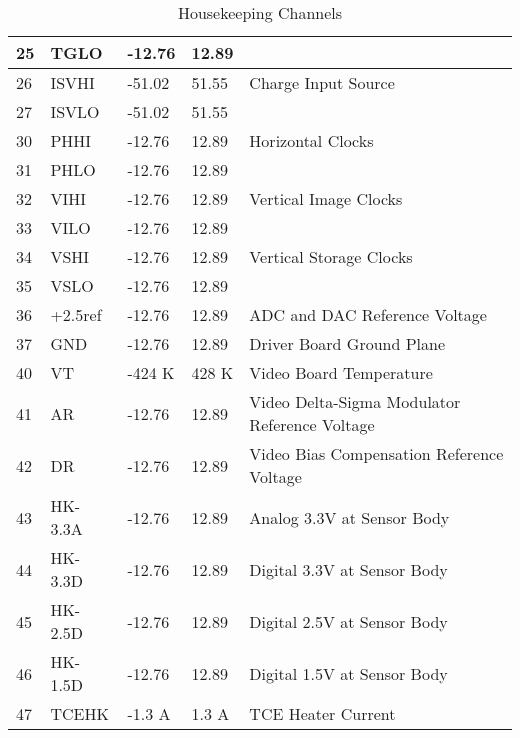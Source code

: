 \begin{table}[h]
\begin{tabular}{|l|l|l|l|l|}
25 & TGLO & -12.76 & 12.89& \\
\hline
26 & ISVHI & -51.02 & 51.55 & Charge Input Source\\
27 & ISVLO &-51.02 & 51.55& \\
\hline
30 & PHHI & -12.76 & 12.89& Horizontal Clocks\\
31 & PHLO & -12.76 & 12.89&\\
\hline
32 & VIHI & -12.76 & 12.89& Vertical Image Clocks\\
33 & VILO & -12.76 & 12.89&\\
\hline
34 & VSHI & -12.76 & 12.89& Vertical Storage Clocks\\
35 & VSLO & -12.76 & 12.89&\\
\hline
36 & +2.5ref & -12.76 & 12.89& ADC and DAC Reference Voltage\\
\hline
37 & GND & -12.76 & 12.89& Driver Board Ground Plane\\
\hline
40 & VT & -424 K& 428 K & Video Board Temperature\\
\hline
41 & AR & -12.76 & 12.89& Video Delta-Sigma Modulator Reference Voltage\\
\hline
42 & DR &-12.76 & 12.89& Video Bias Compensation Reference Voltage\\
\hline
43 & HK-3.3A &-12.76 & 12.89& Analog 3.3V at Sensor Body\\
\hline
44 & HK-3.3D &-12.76 & 12.89& Digital 3.3V at Sensor Body\\
\hline
45 & HK-2.5D &-12.76 & 12.89& Digital 2.5V at Sensor Body\\
\hline
46 & HK-1.5D &-12.76 & 12.89& Digital 1.5V at Sensor Body\\
\hline
47 & TCEHK & -1.3 A& 1.3 A & TCE Heater Current\\
\hline
\end{tabular}
\caption{Housekeeping Channels}
\label{HKC}
\end{table}

